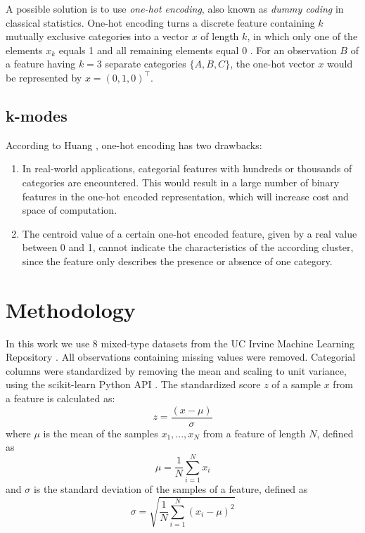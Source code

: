 A possible solution is to use \textit{one-hot encoding}, also known as \textit{dummy coding} in classical statistics. One-hot encoding turns a discrete feature containing $k$ mutually exclusive categories into a vector $x$ of length $k$, in which only one of the elements $x_k$ equals 1 and all remaining elements equal 0 \cite{bishop_2006}. For an observation $B$ of a feature having $k=3$ separate categories $\{A, B, C\}$, the one-hot vector $x$ would be represented by $x = (0, 1, 0)^{\intercal}$.

\subsection{k-modes}

According to Huang \cite{kmodes}, one-hot encoding has two drawbacks:

\begin{enumerate} 
	\item In real-world applications, categorial features with hundreds or thousands of categories are encountered. This would result in a large number of binary features in the one-hot encoded representation, which will increase cost and space of computation.
	\item The centroid value of a certain one-hot encoded feature, given by a real value between 0 and 1, cannot indicate the characteristics of the according cluster, since the feature only describes the presence or absence of one category.
\end{enumerate}





\section{Methodology}

In this work we use 8 mixed-type datasets from the UC Irvine Machine Learning Repository \cite{uci_ml_rpo}. All observations containing missing values were removed. Categorial columns were standardized by removing the mean and scaling to unit variance, using the scikit-learn Python API \cite{scikit_learn}. The standardized score $z$ of a sample $x$ from a feature is calculated as:
$$z = \frac{(x-\mu)}{\sigma}$$
where $\mu$ is the mean of the samples $x_1, ...,x_N$ from a feature of length $N$, defined as
$$\mu = \frac{1}{N} \sum^{N}_{i=1} x_i$$
and $\sigma$ is the standard deviation of the samples of a feature, defined as
$$\sigma = \sqrt{\frac{1}{N} \sum^{N}_{i=1}(x_i - \mu)^2}$$




